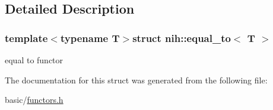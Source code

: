 \subsection{\-Detailed \-Description}
\subsubsection*{template$<$typename T$>$struct nih\-::equal\-\_\-to$<$ T $>$}

equal to functor 

\-The documentation for this struct was generated from the following file\-:\begin{DoxyCompactItemize}
\item 
basic/\hyperlink{functors_8h}{functors.\-h}\end{DoxyCompactItemize}
